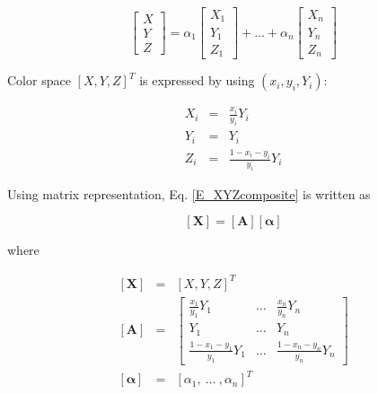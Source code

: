 \documentclass[dvipdfmx,uplatex]{article}
\begin{document}
\begin{equation}
  \label{E_XYZcomposite}
  \left[
    \begin{array}{c}
      X \\
      Y \\
      Z
    \end{array}
  \right]
   = \alpha_1
  \left[
    \begin{array}{c}
        X_1 \\
        Y_1 \\
        Z_1
    \end{array}
  \right]
   + \ldots + \alpha_n
  \left[
    \begin{array}{c}
        X_n \\
        Y_n \\
        Z_n
    \end{array}
  \right]
\end{equation}

Color space $[X, Y, Z]^T$ is expressed by using $(x_i, y_i, Y_i)$:

\begin{eqnarray}
  \label{E_xyY2XYZ}
  X_i & = & \frac{x_i}{y_i}  Y_i \\
  Y_i & = & Y_i \\
  Z_i & = & \frac{1 - x_i - y_i}{y_i} Y_i
\end{eqnarray}

Using matrix representation, Eq. \ref{E_XYZcomposite} is written as

\begin{equation}
  \label{E_X=AY}
  \left[ \boldsymbol{X} \right] =
  \left[ \boldsymbol{A} \right]
  \left[ \boldsymbol{\alpha} \right]
\end{equation}

\noindent
where

\begin{eqnarray}
  \left[ \boldsymbol{X} \right] &=&
  \left[ X, Y, Z \right]^T \label{E_XYZ^T} \\
  \left[ \boldsymbol{A} \right] &=&
  \left[
    \begin{array}{ccc}
      \frac{x_1}{y_1} Y_1 & \ldots & \frac{x_n}{y_n} Y_n \\
      Y_1 & \ldots & Y_n \\
      \frac{1 - x_1 - y_1}{y_1}Y_1 & \ldots & \frac{1 - x_n - y_n}{y_n}Y_n
    \end{array}
  \right] \\
  \left[ \boldsymbol{\alpha} \right] &=&
  \left[ \alpha_1,\ \ldots\ , \alpha_n \right]^T
\end{eqnarray}
\end{document}
